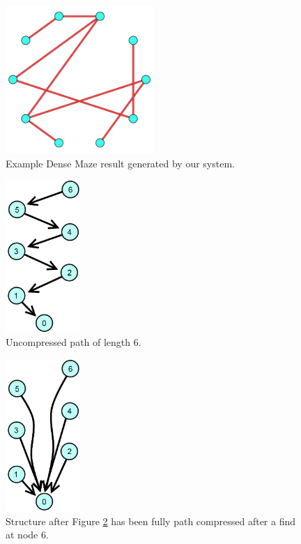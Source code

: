 \documentclass[11pt]{article}
\begin{document}
\begin{figure}[h]
\centering
\includegraphics[width=0.5\textwidth]{Dense2}
\caption{Example Dense Maze result generated by our system.}
\label{fig:Dense-result}
\end{figure}




\begin{figure}[h]
\centering
\includegraphics[width=0.25\textwidth]{UncompressedPath}
\caption{Uncompressed path of length 6.}
\label{fig:Path-NPC}
\end{figure}

\begin{figure}[h]
\centering
\includegraphics[width=0.25\textwidth]{FullPathCompression}
\caption{Structure after Figure \ref{fig:Path-NPC} has been fully path compressed after a find at node 6.}
\label{fig:Path-FPC}
\end{figure}
\end{document}

